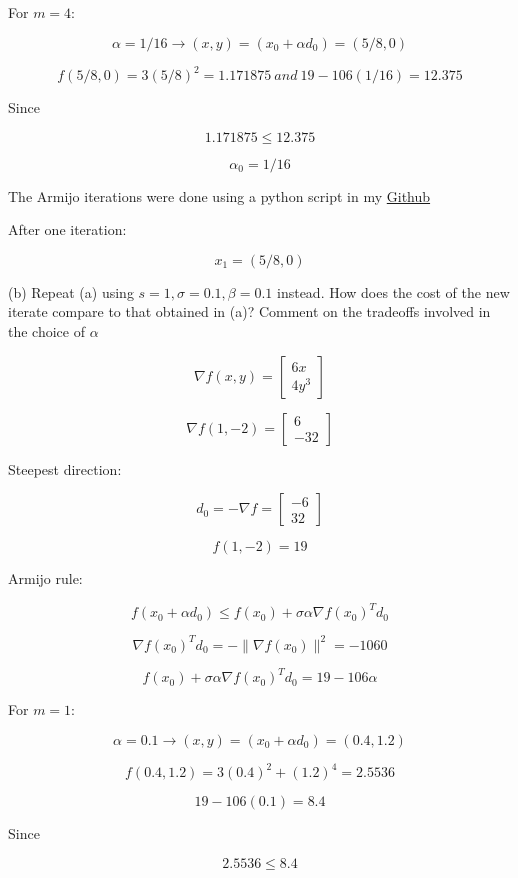 \documentclass[11pt,letterpaper]{article}
\begin{document}
\begin{enumerate}
	For $m = 4$:

	\[ \alpha = 1/16 \rightarrow (x,y) = 
	(x_0 + \alpha d_0) = (5/8, 0)\]

	\[ f(5/8, 0) = 3(5/8)^2 = 1.171875 \ and \ 19 - 106(1/16) = 12.375\]

	Since

	\[ 1.171875 \leq 12.375 \]  

	\[ \alpha_0 = 1/16 \]

	The Armijo iterations were done using a python script in my 
	\href{https://github.com/hess0297/EE5293/tree/main/HW2}{Github}

	After one iteration:

	\[ x_1 = (5/8, 0) \]

	(b) Repeat (a) using $s = 1, \sigma = 0.1, \beta = 0.1$ instead.
	How does the cost of the new iterate compare to that obtained
	in (a)? 
	Comment on the tradeoffs involved in the choice of $\alpha$

	\[
	\nabla f(x,y) =  
	\begin{bmatrix} 6x \\ 4y^3 \end{bmatrix}
	\]

	\[
	\nabla f(1,-2) =  
	\begin{bmatrix} 6 \\ -32 \end{bmatrix}
	\]

	Steepest direction:

	\[
	d_0 = - \nabla f =
	\begin{bmatrix} -6 \\ 32 \end{bmatrix}
	\]

	\[
	f(1,-2) = 19
	\]

	Armijo rule:

	\[
	f(x_0 + \alpha d_0) \leq f(x_0) +
	\sigma \alpha \nabla f(x_0)^T d_0
	\]

	\[
	\nabla f(x_0)^T d_0 =
	-\| \nabla f(x_0) \|^2 = -1060
	\]

	\[
	f(x_0) +
	\sigma \alpha \nabla f(x_0)^T d_0
	= 19 - 106\alpha
	\]

	For $m=1$:

	\[
	\alpha = 0.1 \rightarrow (x,y) =
	(x_0 + \alpha d_0) = (0.4, 1.2)
	\]

	\[
	f(0.4, 1.2)
	= 3(0.4)^2 + (1.2)^4
	= 2.5536
	\]

	\[
	19 - 106(0.1) = 8.4
	\]

	Since

	\[
	2.5536 \leq 8.4
	\]


\end{enumerate}
\end{document}
